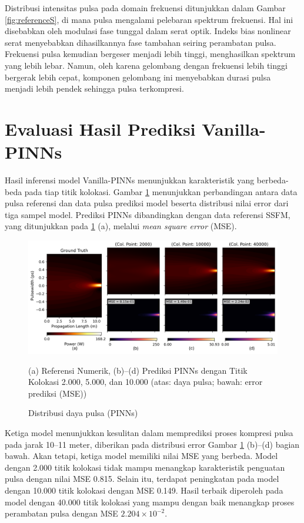 Distribusi intensitas pulsa pada domain frekuensi ditunjukkan dalam Gambar \ref{fig:referenceS}, di mana pulsa mengalami pelebaran spektrum frekuensi. Hal ini disebabkan oleh modulasi fase tunggal dalam serat optik. Indeks bias nonlinear serat menyebabkan dihasilkannya fase tambahan seiring perambatan pulsa. Frekuensi pulsa kemudian bergeser menjadi lebih tinggi, menghasilkan spektrum yang lebih lebar. Namun, oleh karena gelombang dengan frekuensi lebih tinggi bergerak lebih cepat, komponen gelombang ini menyebabkan durasi pulsa menjadi lebih pendek sehingga pulsa terkompresi.

\section{Evaluasi Hasil Prediksi Vanilla-PINNs}
Hasil inferensi model Vanilla-PINNs menunjukkan karakteristik yang berbeda-beda pada tiap titik kolokasi. Gambar \ref{fig:pulsePINNs} menunjukkan perbandingan antara data pulsa referensi dan data pulsa prediksi model beserta distribusi nilai error dari tiga sampel model. Prediksi PINNs dibandingkan dengan data referensi SSFM, yang ditunjukkan pada \ref{fig:pulsePINNs} (a), melalui \emph{mean square error} (MSE).

\newpage
\begin{figure}[htbp]
    \centering
    \includegraphics[width=0.9\linewidth]{Gambar/resultsVanilla.png}
    \caption{Distribusi daya pulsa (PINNs)}
    (a) Referensi Numerik, (b)--(d) Prediksi PINNs dengan Titik Kolokasi 2.000, 5.000, dan 10.000 (atas: daya pulsa; bawah: error prediksi (MSE))
    \label{fig:pulsePINNs}
\end{figure}

Ketiga model menunjukkan kesulitan dalam memprediksi proses kompresi pulsa pada jarak 10--11 meter, diberikan pada distribusi error Gambar \ref{fig:pulsePINNs} (b)--(d) bagian bawah. Akan tetapi, ketiga model memiliki nilai MSE yang berbeda. Model dengan 2.000 titik kolokasi tidak mampu menangkap karakteristik penguatan pulsa dengan nilai MSE 0.815. Selain itu, terdapat peningkatan pada model dengan 10.000 titik kolokasi dengan MSE 0.149. Hasil terbaik diperoleh pada model dengan 40.000 titik kolokasi yang mampu dengan baik menangkap proses perambatan pulsa dengan MSE $2.204\times10^{-2}$.

